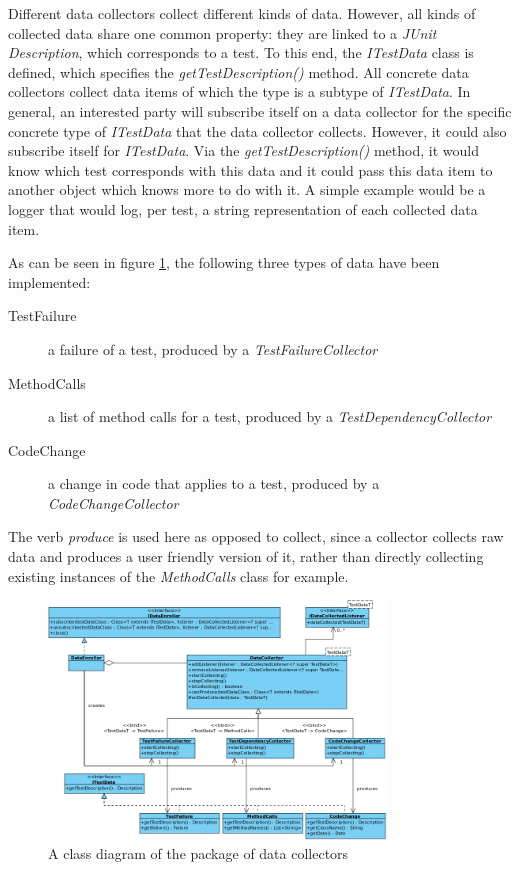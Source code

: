 \documentclass[i2]{oss}
\newcommand{\class}[1]{\emph{#1}}
\newcommand{\method}[1]{\emph{#1}}
\newcommand{\junit}{\emph{JUnit }}
\begin{document}
Different data collectors collect different kinds of data.
However, all kinds of collected data share one common property: they are linked to a \junit \class{Description}, which corresponds to a test.
To this end, the \class{ITestData} class is defined, which specifies the \method{getTestDescription()} method.
All concrete data collectors collect data items of which the type is a subtype of \class{ITestData}.
In general, an interested party will subscribe itself on a data collector for the specific concrete type of \class{ITestData} that the data collector collects.
However, it could also subscribe itself for \class{ITestData}.
Via the \method{getTestDescription()} method, it would know which test corresponds with this data and it could pass this data item to another object which knows more to do with it.
A simple example would be a logger that would log, per test, a string representation of each collected data item.

As can be seen in figure \ref{fig:diagram:collectors}, the following three types of data have been implemented:
\begin{description}
\item[TestFailure] a failure of a test, produced by a \class{TestFailureCollector}
\item[MethodCalls] a list of method calls for a test, produced by a \class{TestDependencyCollector}
\item[CodeChange] a change in code that applies to a test, produced by a \class{CodeChangeCollector}
\end{description}
The verb \emph{produce} is used here as opposed to collect, since a collector collects raw data and produces a user friendly version of it, rather than directly collecting existing instances of the \class{MethodCalls} class for example.

\begin{figure}[tbp]
\begin{center}
    \includegraphics[width=0.8\textwidth]{DataCollectors}
    \caption{A class diagram of the package of data collectors}
	\label{fig:diagram:collectors}
\end{center}
\end{figure}
\end{document}
